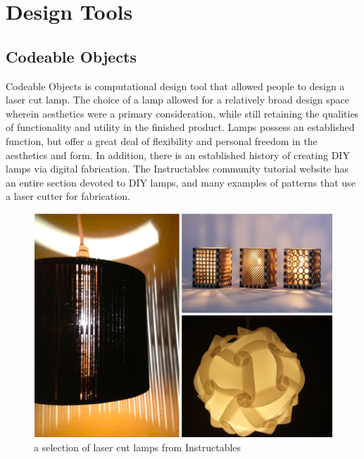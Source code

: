 \chapter{Design Tools}

\section{Codeable Objects}
Codeable Objects is computational design tool that allowed people to design a laser cut lamp. The choice of a lamp allowed for a relatively broad design space wherein aesthetics were a primary consideration, while still retaining the qualities of functionality and utility in the finished product.  Lamps possess an established function, but offer a great deal of flexibility and personal freedom in the aesthetics and form. In addition, there is an established history of creating DIY lamps via digital fabrication. The Instructables community tutorial website has an entire section devoted to DIY lamps, and many examples of patterns that use a laser cutter for fabrication. 
\begin{center}
\begin{figure}[h!]
\includegraphics[width=6.5in]{images/instructables_lamps.png}
\caption{a selection of laser cut lamps from Instructables}
\end{figure}
\end{center}
